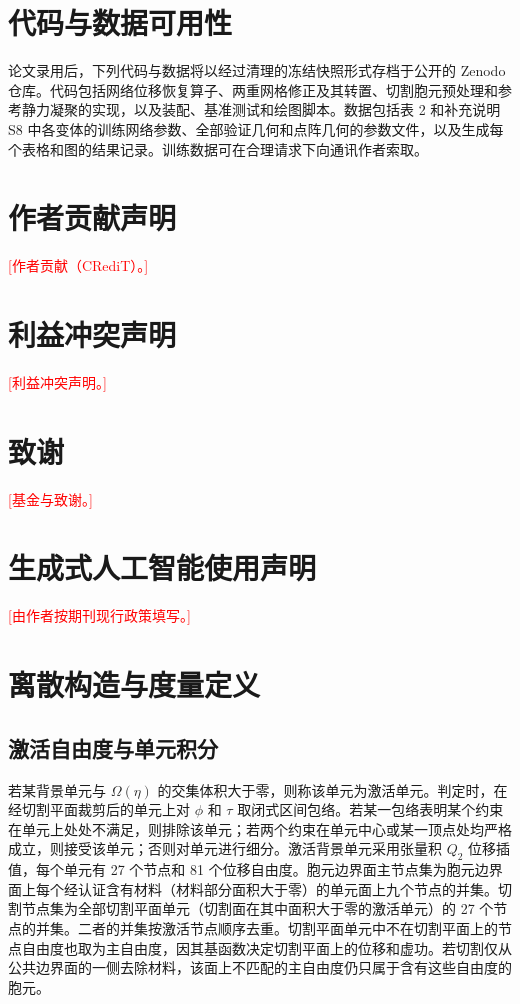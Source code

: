 \documentclass[preprint,12pt,authoryear]{elsarticle}
\begin{document}
\section*{代码与数据可用性}

论文录用后，下列代码与数据将以经过清理的冻结快照形式存档于公开的 Zenodo 仓库。代码包括网络位移恢复算子、两重网格修正及其转置、切割胞元预处理和参考静力凝聚的实现，以及装配、基准测试和绘图脚本。数据包括表 2 和补充说明 S8 中各变体的训练网络参数、全部验证几何和点阵几何的参数文件，以及生成每个表格和图的结果记录。训练数据可在合理请求下向通讯作者索取。

\section*{作者贡献声明}
\textcolor{red}{[作者贡献（CRediT）。]}

\section*{利益冲突声明}
\textcolor{red}{[利益冲突声明。]}

\section*{致谢}
\textcolor{red}{[基金与致谢。]}

\section*{生成式人工智能使用声明}
\textcolor{red}{[由作者按期刊现行政策填写。]}


\appendix{}
\section{离散构造与度量定义}

\subsection{激活自由度与单元积分}

若某背景单元与 \(\Omega(\eta)\) 的交集体积大于零，则称该单元为激活单元。判定时，在经切割平面裁剪后的单元上对 \(\phi\) 和 \(\tau\) 取闭式区间包络。若某一包络表明某个约束在单元上处处不满足，则排除该单元；若两个约束在单元中心或某一顶点处均严格成立，则接受该单元；否则对单元进行细分。激活背景单元采用张量积 \(Q_2\) 位移插值，每个单元有 27 个节点和 81 个位移自由度。胞元边界面主节点集为胞元边界面上每个经认证含有材料（材料部分面积大于零）的单元面上九个节点的并集。切割节点集为全部切割平面单元（切割面在其中面积大于零的激活单元）的 27 个节点的并集。二者的并集按激活节点顺序去重。切割平面单元中不在切割平面上的节点自由度也取为主自由度，因其基函数决定切割平面上的位移和虚功。若切割仅从公共边界面的一侧去除材料，该面上不匹配的主自由度仍只属于含有这些自由度的胞元。
\end{document}
